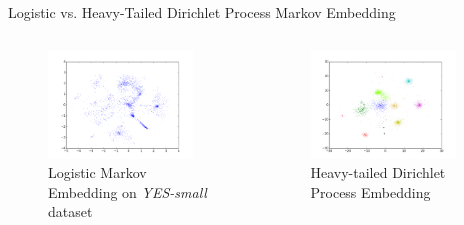 \documentclass{beamer}
\begin{document}
\begin{frame}{Logistic vs. Heavy-Tailed Dirichlet Process Markov Embedding}
\begin{columns}[c]
\column{5.5cm}
\begin{figure}
  \caption{Logistic Markov Embedding on \emph{YES-small} dataset \cite{LME}}
    \includegraphics[width=0.9\textwidth]{LME.png}
\end{figure}
\column{5.5cm}
\pause
\begin{figure}
  \caption{Heavy-tailed Dirichlet Process Embedding}
    \includegraphics[width=0.9\textwidth]{ProbEmbed.png}
\end{figure}
\end{columns}
\end{frame}
\end{document}
